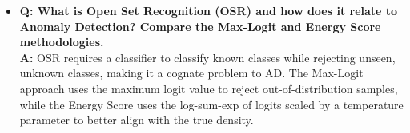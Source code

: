 \begin{itemize}
    \item \textbf{Q: What is Open Set Recognition (OSR) and how does it relate to Anomaly Detection? Compare the Max-Logit and Energy Score methodologies.} \\
    \textbf{A:} OSR requires a classifier to classify known classes while rejecting unseen, unknown classes, making it a cognate problem to AD. The Max-Logit approach uses the maximum logit value to reject out-of-distribution samples, while the Energy Score uses the log-sum-exp of logits scaled by a temperature parameter to better align with the true density.
\end{itemize}
